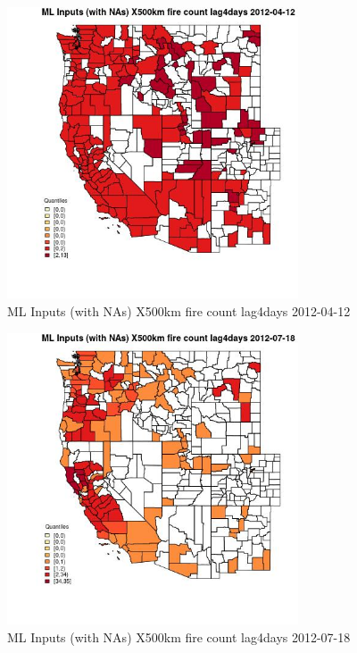 \clearpage 

\begin{figure} 
\centering  
\includegraphics[width=0.77\textwidth]{Code_Outputs/Report_ML_input_PM25_Step4_part_e_de_duplicated_aves_compiled_2019-05-14wNAs_CountyX500km_fire_count_lag4daysMean2012-04-12_2012-04-12.jpg} 
\caption{\label{fig:Report_ML_input_PM25_Step4_part_e_de_duplicated_aves_compiled_2019-05-14wNAsCountyX500km_fire_count_lag4daysMean2012-04-12_2012-04-12}ML Inputs (with NAs) X500km fire count lag4days 2012-04-12} 
\end{figure} 
 

\begin{figure} 
\centering  
\includegraphics[width=0.77\textwidth]{Code_Outputs/Report_ML_input_PM25_Step4_part_e_de_duplicated_aves_compiled_2019-05-14wNAs_CountyX500km_fire_count_lag4daysMean2012-07-18_2012-07-18.jpg} 
\caption{\label{fig:Report_ML_input_PM25_Step4_part_e_de_duplicated_aves_compiled_2019-05-14wNAsCountyX500km_fire_count_lag4daysMean2012-07-18_2012-07-18}ML Inputs (with NAs) X500km fire count lag4days 2012-07-18} 
\end{figure} 
 

